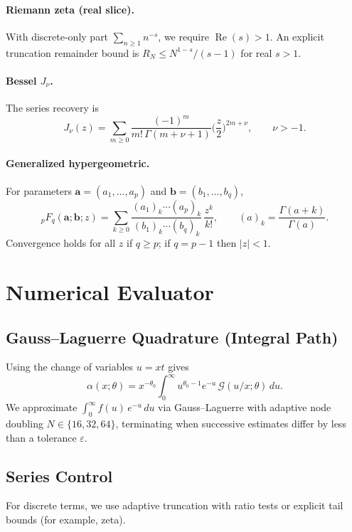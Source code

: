 \documentclass[11pt]{article}
\theoremstyle{remark}
\newcommand{\RePart}{\operatorname{Re}}
\begin{document}
\paragraph{Riemann zeta (real slice).} With discrete-only part \(\sum_{n\ge1} n^{-s}\), we require \(\RePart(s)>1\). An explicit truncation remainder bound is \(R_N\le N^{1-s}/(s-1)\) for real \(s>1\).

\paragraph{Bessel $J_\nu$.} The series recovery is
\begin{equation}
J_\nu(z)=\sum_{m\ge0}\frac{(-1)^m}{m!\,\Gamma(m+\nu+1)}\Big(\frac{z}{2}\Big)^{2m+\nu},\qquad \nu>-1.
\end{equation}

\paragraph{Generalized hypergeometric.} For parameters \(\bm{a}=(a_1,\ldots,a_p)\) and \(\bm{b}=(b_1,\ldots,b_q)\),
\begin{equation}
{}_pF_q(\bm{a};\bm{b};z)=\sum_{k\ge0}\frac{(a_1)_k\cdots(a_p)_k}{(b_1)_k\cdots(b_q)_k}\,\frac{z^k}{k!},\qquad (a)_k=\frac{\Gamma(a+k)}{\Gamma(a)}.
\end{equation}
Convergence holds for all \(z\) if \(q\ge p\); if \(q=p-1\) then \(|z|<1\).

\section{Numerical Evaluator}
\label{sec:evaluator}
\subsection{Gauss--Laguerre Quadrature (Integral Path)}
Using the change of variables \(u=xt\) gives
\begin{equation}
\alpha(x;\theta)=x^{-\theta_0}\int_0^{\infty} u^{\theta_0-1}e^{-u}\,\mathcal{G}(u/x;\theta)\,du.
\end{equation}
We approximate \(\int_0^{\infty} f(u)\,e^{-u}\,du\) via Gauss--Laguerre with adaptive node doubling \(N\in\{16,32,64\}\), terminating when successive estimates differ by less than a tolerance \(\varepsilon\).

\subsection{Series Control}
For discrete terms, we use adaptive truncation with ratio tests or explicit tail bounds (for example, zeta).
\end{document}
